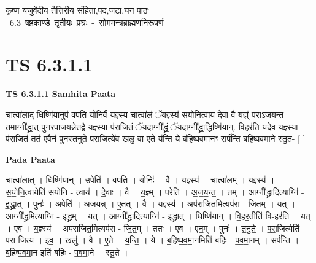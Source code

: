 \documentclass[17pt]{extarticle}
\begin{document}
\begin{titlepage}
    \begin{center}
 
\begin{sanskrit}
    { \Large
    कृष्ण यजुर्वेदीय तैत्तिरीय संहिता,पद,जटा,घन पाठः 
    }
    \\
    \vspace{2.5cm}
    \mbox{ \Large
    6.3      षष्ठकाण्डे तृतीयः प्रश्नः - सोममन्त्रब्राह्मणनिरूपणं   }
\end{sanskrit}
\end{center}

\end{titlepage}
\tableofcontents
{}
\pagebreak


\section{ TS 6.3.1.1 }

\textbf{TS 6.3.1.1 } \newline
\textbf{Samhita Paata} \newline

चात्वा॑ला॒द्-धिष्णि॑या॒नुप॑ वपति॒ योनि॒र्वै य॒ज्ञ्स्य॒ चात्वा॑लं ॅय॒ज्ञ्स्य॑ सयोनि॒त्वाय॑ दे॒वा वै य॒ज्ञ्ं परा॑ऽजयन्त॒ तमाग्नी᳚द्ध्रा॒त् पुन॒रपा॑जयन्ने॒तद्वै य॒ज्ञ्स्या-प॑राजितं॒ ॅयदाग्नी᳚द्ध्रं॒ ॅयदाग्नी᳚द्ध्रा॒द्धिष्णि॑यान्. वि॒हर॑ति॒ यदे॒व  य॒ज्ञ्स्या-प॑राजितं॒ तत॑ ए॒वैनं॒ पुन॑स्तनुते परा॒जित्ये॑व॒ खलु॒ वा ए॒ते य॑न्ति॒ ये ब॑हिष्पवमा॒नꣳ सर्प॑न्ति बहिष्पवमा॒ने स्तु॒त- [  ] \newline

\textbf{Pada Paata} \newline

चात्वा॑लात् । धिष्णि॑यान् । उपेति॑ । व॒प॒ति॒ । योनिः॑ । वै । य॒ज्ञ्स्य॑ । चात्वा॑लम् । य॒ज्ञ्स्य॑ । स॒यो॒नि॒त्वायेति॑ सयोनि - त्वाय॑ । दे॒वाः । वै । य॒ज्ञ्म् । परेति॑ । अ॒ज॒य॒न्त॒ । तम् । आग्नी᳚᳚द्ध्रा॒दित्याग्नि॑ - इ॒द्ध्रा॒त् । पुनः॑ । अपेति॑ । अ॒ज॒य॒न्न् । ए॒तत् । वै । य॒ज्ञ्स्य॑ । अप॑राजित॒मित्यप॑रा - जि॒त॒म् । यत् । आग्नी᳚द्ध्र॒मित्याग्नि॑ - इ॒द्ध्र॒म् । यत् । आग्नी᳚द्ध्रा॒दित्याग्नि॑ - इ॒द्ध्रा॒त् । धिष्णि॑यान् । वि॒हर॒तीति॑ वि-हर॑ति । यत् । ए॒व । य॒ज्ञ्स्य॑ । अप॑राजित॒मित्यप॑रा - जि॒त॒म् । ततः॑ । ए॒व । ए॒न॒म् । पुनः॑ । त॒नु॒ते॒ । प॒रा॒जित्येति॑ परा-जित्य॑ । इ॒व॒ । खलु॑ । वै । ए॒ते । य॒न्ति॒ । ये । ब॒हि॒ष्प॒व॒मा॒नमिति॑ बहिः - प॒व॒मा॒नम् । सर्प॑न्ति । ब॒हि॒ष्प॒व॒मा॒न इति॑ बहिः - प॒व॒मा॒ने । स्तु॒ते ।  \newline
\end{document}
